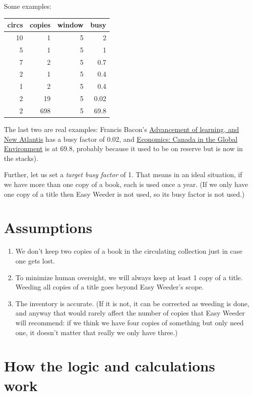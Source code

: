 \documentclass[11pt]{article}
\begin{document}
Some examples:

\begin{center}
\begin{tabular}{rrrr}
circs & copies & window & busy\\
\hline
10 & 1 & 5 & 2\\
5 & 1 & 5 & 1\\
7 & 2 & 5 & 0.7\\
2 & 1 & 5 & 0.4\\
1 & 2 & 5 & 0.4\\
2 & 19 & 5 & 0.02\\
2 & 698 & 5 & 69.8\\
\end{tabular}
\end{center}

The last two are real examples: Francis Bacon's \href{https://www.library.yorku.ca/find/Record/567179}{Advancement of learning, and New Atlantis} has a busy factor of 0.02, and \href{https://www.library.yorku.ca/find/Record/2914459}{Economics: Canada in the Global Environment} is at 69.8, probably because it used to be on reserve but is now in the stacks).

Further, let us set a \emph{target busy factor} of 1.  That means in an ideal situation, if we have more than one copy of a book, each is used once a year.  (If we only have one copy of a title then Easy Weeder is not used, so its busy factor is not used.)

\section*{Assumptions}
\label{sec:org869c4b3}

\begin{enumerate}
\item We don't keep two copies of a book in the circulating collection just in case one gets lost.
\item To minimize human oversight, we will always keep at least 1 copy of a title.  Weeding all copies of a title goes beyond Easy Weeder's scope.
\item The inventory is accurate.  (If it is not, it can be corrected as weeding is done, and anyway that would rarely affect the number of copies that Easy Weeder will recommend: if we think we have four copies of something but only need one, it doesn't matter that really we only have three.)
\end{enumerate}

\section*{How the logic and calculations work}
\label{sec:org1edb5a5}
\end{document}

